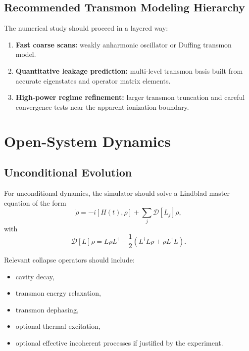 \documentclass[11pt]{article}
\begin{document}
\subsection{Recommended Transmon Modeling Hierarchy}

The numerical study should proceed in a layered way:
\begin{enumerate}[leftmargin=2em]
    \item \textbf{Fast coarse scans:} weakly anharmonic oscillator or Duffing transmon
    model.
    \item \textbf{Quantitative leakage prediction:} multi-level transmon basis built from
    accurate eigenstates and operator matrix elements.
    \item \textbf{High-power regime refinement:} larger transmon truncation and careful
    convergence tests near the apparent ionization boundary.
\end{enumerate}

\section{Open-System Dynamics}

\subsection{Unconditional Evolution}

For unconditional dynamics, the simulator should solve a Lindblad master equation of the
form
\begin{equation}
    \dot{\rho} = -i[H(t), \rho] + \sum_j \mathcal{D}[L_j]\rho,
\end{equation}
with
\begin{equation}
    \mathcal{D}[L]\rho = L\rho L^\dagger - \frac{1}{2}\left(L^\dagger L \rho + \rho L^\dagger L\right).
\end{equation}

Relevant collapse operators should include:
\begin{itemize}[leftmargin=2em]
    \item cavity decay,
    \item transmon energy relaxation,
    \item transmon dephasing,
    \item optional thermal excitation,
    \item optional effective incoherent processes if justified by the experiment.
\end{itemize}
\end{document}

